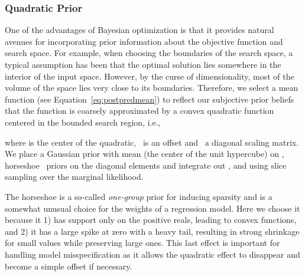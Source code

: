 \documentclass{article}
\begin{document}
\subsubsection{Quadratic Prior}
\label{quadratic}
One of the advantages of Bayesian optimization is that it provides natural avenues for incorporating prior information about the objective function and search space. For example, when choosing the boundaries of the search space, a typical assumption has been that the optimal solution lies somewhere in the interior of the input space. However, by the curse of dimensionality, most of the volume of the space lies very close to its boundaries. Therefore, we select a mean function  (see Equation~\ref{eq:postpredmean}) to reflect our subjective prior beliefs that the function is coarsely approximated by a convex quadratic function centered in the bounded search region, i.e.,

where  is the center of the quadratic,~ is an offset and~ a diagonal scaling matrix.  We place a Gaussian prior with mean  (the center of the unit hypercube) on , horseshoe~\cite{carvalho-2009a} priors on the diagonal elements  and integrate out ,  and  using slice sampling over the marginal likelihood.

The horseshoe is a so-called \emph{one-group} prior for inducing sparsity and is a somewhat unusual choice for the weights of a regression model.  Here we choose it because it 1) has support only on the positive reals, leading to convex functions, and 2) it has a large spike at zero with a heavy tail, resulting in strong shrinkage for small values while preserving large ones.  This last effect is important for handling model misspecification as it allows the quadratic effect to disappear and become a simple offset if necessary.


\begin{table*}[t]
  \centering
\end{table*}
\end{document}
